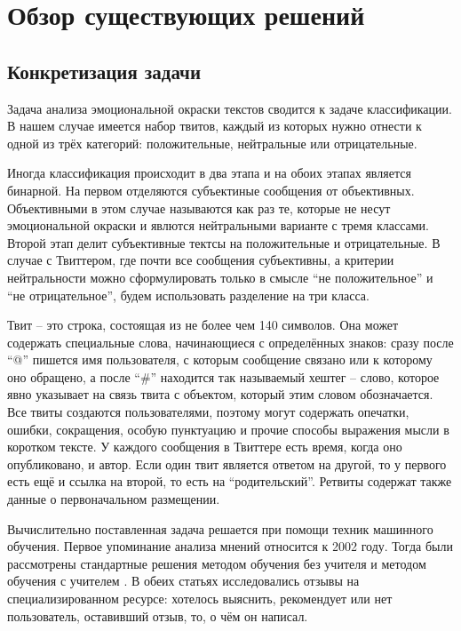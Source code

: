 \section{Обзор существующих решений}

\subsection{Конкретизация задачи}
Задача анализа эмоциональной окраски текстов сводится к задаче классификации. В
нашем случае имеется набор твитов, каждый из которых нужно отнести к одной из
трёх категорий: положительные, нейтральные или отрицательные.

Иногда классификация происходит в два этапа и на обоих этапах является бинарной.
На первом отделяются субъектиные сообщения от объективных. Объективными в этом
случае называются как раз те, которые не несут эмоциональной окраски и
явлются нейтральными варианте с тремя классами. Второй этап делит субъективные
тектсы на положительные и отрицательные. В случае с Твиттером, где почти все
сообщения субъективны, а критерии нейтральности можно сформулировать только в
смысле ``не положительное'' и ``не отрицательное'', будем использовать разделение
на три класса.

Твит -- это строка, состоящая из не более чем 140 символов. Она может содержать
специальные слова, начинающиеся с определённых знаков: сразу после ``@'' пишется
имя пользователя, с которым сообщение связано или к которому оно обращено,
а после ``\#'' находится так называемый хештег -- слово, которое явно указывает
на связь твита с объектом, который этим словом обозначается. Все твиты создаются
пользователями, поэтому могут содержать опечатки, ошибки, сокращения,
особую пунктуацию и прочие способы выражения мысли в коротком тексте.
У каждого сообщения в Твиттере есть время, когда оно опубликовано, и автор.
Если один твит является ответом на другой, то у первого есть ещё и ссылка на второй,
то есть на ``родительский''. Ретвиты содержат также данные о первоначальном
размещении.

Вычислительно поставленная задача решается при помощи техник машинного обучения. Первое
упоминание анализа мнений относится к 2002 году. Тогда были рассмотрены
стандартные решения методом обучения без учителя \cite{turney2002thumbs} и методом обучения с
учителем \cite{pang2002thumbs}. В обеих статьях исследовались отзывы на
специализированном ресурсе: хотелось выяснить, рекомендует или нет пользователь, оставивший отзыв,
то, о чём он написал.

